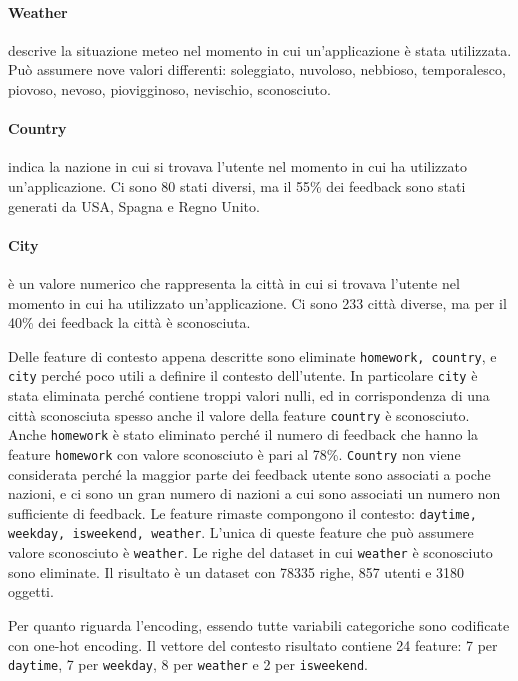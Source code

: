 \documentclass[12pt,italian]{report}
\begin{document}
\paragraph{Weather} descrive la situazione meteo nel momento in cui un'applicazione è stata utilizzata. Può assumere nove valori differenti: soleggiato, nuvoloso, nebbioso, temporalesco, piovoso, nevoso, piovigginoso, nevischio, sconosciuto.

\paragraph{Country} indica la nazione in cui si trovava l'utente nel momento in cui ha utilizzato un'applicazione. Ci sono 80 stati diversi, ma il 55\% dei feedback sono stati generati da USA, Spagna e Regno Unito.

\paragraph{City} è un valore numerico che rappresenta la città in cui si trovava l'utente nel momento in cui ha utilizzato un'applicazione. Ci sono 233 città diverse, ma per il 40\% dei feedback la città è sconosciuta.  

\bigskip \noindent
Delle feature di contesto appena descritte sono eliminate \texttt{homework, country}, e \texttt{city} perché poco utili a definire il contesto dell'utente. In particolare \texttt{city} è stata eliminata perché contiene troppi valori nulli, ed in corrispondenza di una città sconosciuta spesso anche il valore della feature \texttt{country} è sconosciuto. Anche \texttt{homework} è stato eliminato perché il numero di feedback che hanno la feature \texttt{homework} con valore sconosciuto è pari al 78\%. \texttt{Country} non viene considerata perché la maggior parte dei feedback utente sono associati a poche nazioni, e ci sono un gran numero di nazioni a cui sono associati un numero non sufficiente di feedback.
Le feature rimaste compongono il contesto: \texttt{daytime, weekday, isweekend, weather}. L'unica di queste feature che può assumere valore sconosciuto è \texttt{weather}. Le righe del dataset in cui \texttt{weather} è sconosciuto sono eliminate. Il risultato è un dataset con 78335 righe, 857 utenti e 3180 oggetti.

Per quanto riguarda l'encoding, essendo tutte variabili categoriche sono codificate con one-hot encoding. Il vettore del contesto risultato contiene 24 feature: 7 per \texttt{daytime}, 7 per \texttt{weekday}, 8 per \texttt{weather} e 2 per \texttt{isweekend}.
\end{document}
